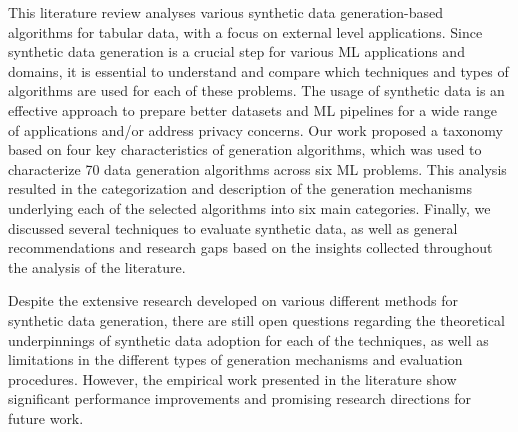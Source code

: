 \documentclass[parskip=full]{scrartcl}
\begin{document}
This literature review analyses various synthetic data generation-based
algorithms for tabular data, with a focus on external level applications.
Since synthetic data generation is a crucial step for various ML applications
and domains, it is essential to understand and compare which techniques and
types of algorithms are used for each of these problems. The usage of
synthetic data is an effective approach to prepare better datasets and ML
pipelines for a wide range of applications and/or address privacy concerns.
Our work proposed a taxonomy based on four key characteristics of generation
algorithms, which was used to characterize 70 data generation algorithms
across six ML problems. This analysis resulted in the categorization and
description of the generation mechanisms underlying each of the selected
algorithms into six main categories. Finally, we discussed several techniques
to evaluate synthetic data, as well as general recommendations and research
gaps based on the insights collected throughout the analysis of the
literature.

Despite the extensive research developed on various different methods for
synthetic data generation, there are still open questions regarding the
theoretical underpinnings of synthetic data adoption for each of the
techniques, as well as limitations in the different types of generation
mechanisms and evaluation procedures. However, the empirical work presented in
the literature show significant performance improvements and promising
research directions for future work.

\printbibliography
\end{document}
